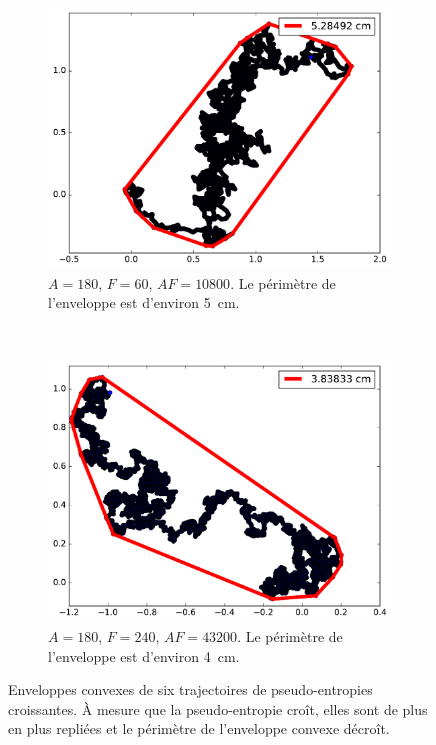 \begin{figure}[htb]
		~
		\begin{subfigure}[t]{\subImgWarea}
			\centering
			\includegraphics[width=\textwidth]{figures/ch3/areaTraj_2_19_180_60}
			\caption{$A = 180$, $F=60$, $AF=10800$. Le périmètre de l'enveloppe est d'environ 5~cm.}
			\label{fig:areaTraj_2_19_180_60}
		\end{subfigure}
		~
		\begin{subfigure}[t]{\subImgWarea}
			\centering
			\includegraphics[width=\textwidth]{figures/ch3/areaTraj_2_19_180_240}
			\caption{$A = 180$, $F=240$, $AF=43200$. Le périmètre de l'enveloppe est d'environ 4~cm.}
			\label{fig:areaTraj_2_19_180_240}
		\end{subfigure}
		\caption[Enveloppes convexes]{Enveloppes convexes de six trajectoires de pseudo-entropies croissantes. À mesure que la pseudo-entropie croît, elles sont de plus en plus \og repliées \fg{} et le périmètre de l'enveloppe convexe décroît.}
		\label{fig:trajAreas}
	\end{figure}
	
